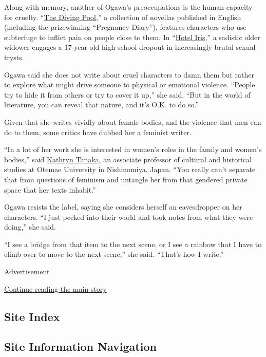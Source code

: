 Along with memory, another of Ogawa's preoccupations is the human
capacity for cruelty.
``\href{https://www.nytimes3xbfgragh.onion/2008/03/23/books/review/McCulloch-t.html}{The
Diving Pool},'' a collection of novellas published in English (including
the prizewinning ``Pregnancy Diary''), features characters who use
subterfuge to inflict pain on people close to them. In
``\href{https://www.nytimes3xbfgragh.onion/2010/05/16/books/review/McCulloch-t.html}{Hotel
Iris},'' a sadistic older widower engages a 17-year-old high school
dropout in increasingly brutal sexual trysts.

Ogawa said she does not write about cruel characters to damn them but
rather to explore what might drive someone to physical or emotional
violence. ``People try to hide it from others or try to cover it up,''
she said. ``But in the world of literature, you can reveal that nature,
and it's O.K. to do so.''

Given that she writes vividly about female bodies, and the violence that
men can do to them, some critics have dubbed her a feminist writer.

``In a lot of her work she is interested in women's roles in the family
and women's bodies,'' said
\href{https://otemaeuniversity.academia.edu/KathrynTanaka}{Kathryn
Tanaka}, an associate professor of cultural and historical studies at
Otemae University in Nishinomiya, Japan. ``You really can't separate
that from questions of feminism and untangle her from that gendered
private space that her texts inhabit.''

Ogawa resists the label, saying she considers herself an eavesdropper on
her characters. ``I just peeked into their world and took notes from
what they were doing,'' she said.

``I see a bridge from that item to the next scene, or I see a rainbow
that I have to climb over to move to the next scene,'' she said.
``That's how I write.''

Advertisement

\protect\hyperlink{after-bottom}{Continue reading the main story}

\hypertarget{site-index}{%
\subsection{Site Index}\label{site-index}}

\hypertarget{site-information-navigation}{%
\subsection{Site Information
Navigation}\label{site-information-navigation}}

